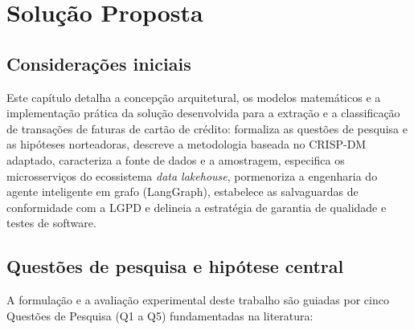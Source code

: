 \chapter{Solução Proposta} \label{Cap:Metodologia}

\section{Considerações iniciais}
\label{sec:sol_consideracoes_iniciais}

Este capítulo detalha a concepção arquitetural, os modelos matemáticos e a implementação prática da solução desenvolvida para a extração e a classificação de transações de faturas de cartão de crédito: formaliza as questões de pesquisa e as hipóteses norteadoras, descreve a metodologia baseada no CRISP-DM adaptado, caracteriza a fonte de dados e a amostragem, especifica os microsserviços do ecossistema \textit{data lakehouse}, pormenoriza a engenharia do agente inteligente em grafo (LangGraph), estabelece as salvaguardas de conformidade com a LGPD e delineia a estratégia de garantia de qualidade e testes de software.

\section{Questões de pesquisa e hipótese central}
\label{sec:sol_questoes_pesquisa}

A formulação e a avaliação experimental deste trabalho são guiadas por cinco Questões de Pesquisa (Q1 a Q5) fundamentadas na literatura:

